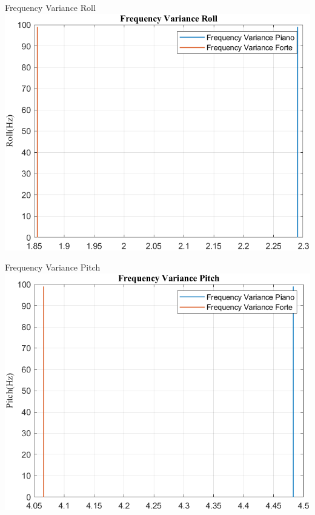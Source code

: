	\begin{frame}{{Frequency Variance Roll}}
		\centering\includegraphics[height=.8\textheight]{figure/VAng/Trasformata/Frequency VarianceRoll}
	\end{frame}
	
	\begin{frame}{{Frequency Variance Pitch}}
		\centering\includegraphics[height=.8\textheight]{figure/VAng/Trasformata/Frequency VariancePitch}
	\end{frame}
	

